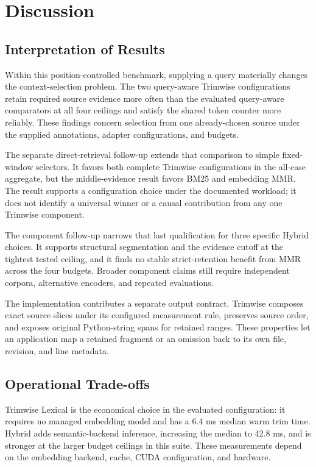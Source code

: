 \documentclass[
]{article}
\begin{document}
\section{Discussion}\label{discussion}

\subsection{Interpretation of Results}\label{what-the-results-establish}

Within this position-controlled benchmark, supplying a query materially
changes the context-selection problem. The two query-aware Trimwise
configurations retain required source evidence more often than the
evaluated query-aware comparators at all four ceilings and satisfy the
shared token counter more reliably. These findings concern selection
from one already-chosen source under the supplied annotations, adapter
configurations, and budgets.

The separate direct-retrieval follow-up extends that comparison to simple
fixed-window selectors. It favors both complete Trimwise configurations in the
all-case aggregate, but the middle-evidence result favors BM25 and embedding
MMR. The result supports a configuration choice under the documented workload;
it does not identify a universal winner or a causal contribution from any one
Trimwise component.

The component follow-up narrows that last qualification for three specific
Hybrid choices. It supports structural segmentation and the evidence cutoff at
the tightest tested ceiling, and it finds no stable strict-retention benefit
from MMR across the four budgets. Broader component claims still require
independent corpora, alternative encoders, and repeated evaluations.

The implementation contributes a separate output contract. Trimwise
composes exact source slices under its configured measurement rule,
preserves source order, and exposes original Python-string spans for
retained ranges. These properties let an application map a retained
fragment or an omission back to its own file, revision, and line
metadata.

\subsection{Operational Trade-offs}\label{operational-trade-offs}

Trimwise Lexical is the economical choice in the evaluated
configuration: it requires no managed embedding model and has a 6.4 ms
median warm trim time. Hybrid adds semantic-backend inference, increasing
the median to 42.8 ms, and is stronger at the larger budget ceilings in
this suite. These measurements depend on the embedding backend, cache,
CUDA configuration, and hardware.
\end{document}
